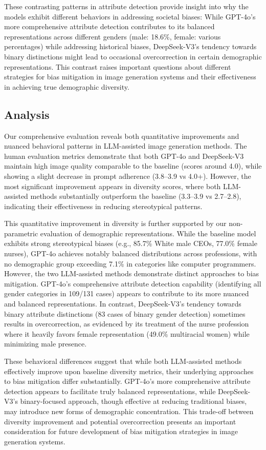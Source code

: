 These contrasting patterns in attribute detection provide insight into why the models exhibit different behaviors in addressing societal biases: While GPT-4o's more comprehensive attribute detection contributes to its balanced representations across different genders (male: 18.6\%, female: various percentages) while addressing historical biases, DeepSeek-V3's tendency towards binary distinctions might lead to occasional overcorrection in certain demographic representations. This contrast raises important questions about different strategies for bias mitigation in image generation systems and their effectiveness in achieving true demographic diversity.

\subsection{Analysis}
Our comprehensive evaluation reveals both quantitative improvements and nuanced behavioral patterns in LLM-assisted image generation methods. The human evaluation metrics demonstrate that both GPT-4o and DeepSeek-V3 maintain high image quality comparable to the baseline (scores around 4.0), while showing a slight decrease in prompt adherence (3.8--3.9 vs 4.0+). However, the most significant improvement appears in diversity scores, where both LLM-assisted methods substantially outperform the baseline (3.3--3.9 vs 2.7--2.8), indicating their effectiveness in reducing stereotypical patterns.

This quantitative improvement in diversity is further supported by our non-parametric evaluation of demographic representations. While the baseline model exhibits strong stereotypical biases (e.g., 85.7\% White male CEOs, 77.0\% female nurses), GPT-4o achieves notably balanced distributions across professions, with no demographic group exceeding 7.1\% in categories like computer programmers. However, the two LLM-assisted methods demonstrate distinct approaches to bias mitigation. GPT-4o's comprehensive attribute detection capability (identifying all gender categories in 109/131 cases) appears to contribute to its more nuanced and balanced representations. In contrast, DeepSeek-V3's tendency towards binary attribute distinctions (83 cases of binary gender detection) sometimes results in overcorrection, as evidenced by its treatment of the nurse profession where it heavily favors female representation (49.0\% multiracial women) while minimizing male presence.

These behavioral differences suggest that while both LLM-assisted methods effectively improve upon baseline diversity metrics, their underlying approaches to bias mitigation differ substantially. GPT-4o's more comprehensive attribute detection appears to facilitate truly balanced representations, while DeepSeek-V3's binary-focused approach, though effective at reducing traditional biases, may introduce new forms of demographic concentration. This trade-off between diversity improvement and potential overcorrection presents an important consideration for future development of bias mitigation strategies in image generation systems.


